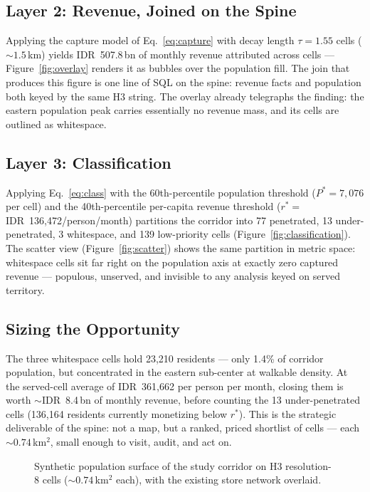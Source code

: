 \documentclass[11pt,a4paper,twocolumn]{article}
\begin{document}
\subsection{Layer 2: Revenue, Joined on the Spine}

Applying the capture model of Eq.~\eqref{eq:capture} with decay length
$\tau = 1.55$ cells (${\sim}1.5$\,km) yields IDR~507.8\,bn of monthly
revenue attributed across cells --- Figure~\ref{fig:overlay} renders it as
bubbles over the population fill. The join that produces this figure is
one line of SQL on the spine: revenue facts and population both keyed by
the same H3 string. The overlay already telegraphs the finding: the
eastern population peak carries essentially no revenue mass, and its
cells are outlined as whitespace.

\subsection{Layer 3: Classification}

Applying Eq.~\eqref{eq:class} with the 60th-percentile population
threshold ($P^{*} = 7{,}076$ per cell) and the 40th-percentile per-capita
revenue threshold ($r^{*} = $ IDR~136{,}472/person/month) partitions the
corridor into 77 penetrated, 13 under-penetrated, 3 whitespace, and 139
low-priority cells (Figure~\ref{fig:classification}). The scatter view
(Figure~\ref{fig:scatter}) shows the same partition in metric space:
whitespace cells sit far right on the population axis at exactly zero
captured revenue --- populous, unserved, and invisible to any analysis
keyed on served territory.

\subsection{Sizing the Opportunity}

The three whitespace cells hold 23{,}210 residents --- only 1.4\% of
corridor population, but concentrated in the eastern sub-center at
walkable density. At the served-cell average of IDR~361{,}662 per person
per month, closing them is worth ${\sim}$IDR~8.4\,bn of monthly revenue,
before counting the 13 under-penetrated cells (136{,}164 residents
currently monetizing below $r^{*}$). This is the strategic deliverable of
the spine: not a map, but a ranked, priced shortlist of cells --- each
${\sim}0.74$\,km$^2$, small enough to visit, audit, and act on.

\begin{figure}[!tp]
  \centering
  \resizebox{0.86\textwidth}{!}{}
  \caption{Synthetic population surface of the study corridor on H3
    resolution-8 cells (${\sim}0.74$\,km$^2$ each), with the existing store
    network overlaid.}
  \label{fig:population}
\end{figure}
\end{document}
